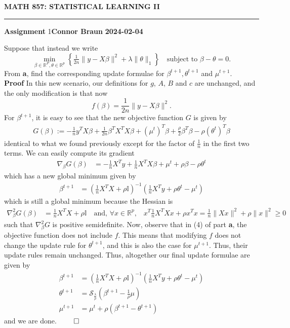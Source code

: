 \documentclass[10pt]{article}
\newcommand{\bp}[1]{\left({#1}\right)}
\newcommand{\mbb}[1]{\mathbb{#1}}
\newcommand{\1}[1]{\mathbbm{1}_{#1}}
\begin{document}
    \begin{center}
        {\bf\large{MATH 857: STATISTICAL LEARNING II}}
        \smallskip
        \hrule
        \smallskip
        {\bf Assignment} 1\hfill {\bf Connor Braun} \hfill {\bf 2024-02-04}
    \end{center}
     Suppose that instead we write
        \[\min_{\beta\in\mbb{R}^P,\theta\in\mbb{R}^p}\left\{\tfrac{1}{2n}\|y-X\beta\|^2+\lambda\|\theta\|_1\right\}\quad\text{subject to $\beta-\theta=0$}.\]
    From {\bf a}, find the corresponding update formulae for $\beta^{t+1},\theta^{t+1}$ and $\mu^{t+1}$.\\[5pt]
    {\bf Proof}\hspace{5pt} In this new scenario, our definitions for $g$, $A$, $B$ and $c$ are unchanged, and the only modification is that now
    \[f(\beta)=\frac{1}{2n}\|y-X\beta\|^2.\]
    For $\beta^{t+1}$, it is easy to see that the new objective function $G$ is given by
    \begin{align*}
        G(\beta):=-\frac{1}{n}y^TX\beta+\frac{1}{2n}\beta^TX^TX\beta+(\mu^t)^T\beta+\frac{\rho}{2}\beta^T\beta-\rho(\theta^t)^T\beta
    \end{align*}
    identical to what we found previously except for the factor of $\tfrac{1}{n}$ in the first two terms. We can easily compute its gradient
    \begin{align*}
        \nabla_\beta G(\beta)&=-\frac{1}{n}X^Ty+\frac{1}{n}X^TX\beta+\mu^t+\rho\beta-\rho\theta^t
    \end{align*}
    which has a new global minimum given by
    \begin{align*}
        \beta^{t+1}&=\bp{\frac{1}{n}X^TX+\rho\mbb{I}}^{-1}\bp{\frac{1}{n}X^Ty+\rho\theta^t-\mu^t}
    \end{align*}
    which is still a global minimum because the Hessian is
    \begin{align*}
        \nabla^2_\beta G(\beta)&=\frac{1}{n}X^TX+\rho\mbb{I}\quad\text{and, $\forall x\in \mbb{R}^p$,}\quad x^T\frac{1}{n}X^TXx+\rho x^Tx=\frac{1}{n}\|Xx\|^2+\rho\|x\|^2\geq 0
    \end{align*}
    such that $\nabla^2_\beta G$ is positive semidefinite. Now, observe that in (4) of part {\bf a}, the objective function does not include $f$. This means that modifying $f$ does not change the update rule for $\theta^{t+1}$, and this is
    also the case for $\mu^{t+1}$. Thus, their update rules remain unchanged. Thus, altogether our final update formulae are given by
    \begin{align*}
        \beta^{t+1}&=\bp{\frac{1}{n}X^TX+\rho\mbb{I}}^{-1}\bp{\frac{1}{n}X^Ty+\rho\theta^t-\mu^t}\\
        \theta^{t+1}&=\mathcal{S}_{\frac{\lambda}{\rho}}\bp{\beta^{t+1}-\frac{1}{\rho}\mu}\\
        \mu^{t+1}&=\mu^t+\rho(\beta^{t+1}-\theta^{t+1})
    \end{align*}
    and we are done. \hfill{$\qed$}
\end{document}
